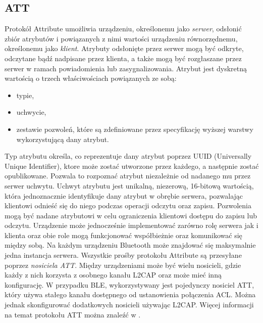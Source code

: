 \subsection{ATT}
Protokół Attribute umożliwia urządzeniu, określonemu jako \textit{serwer}, odsłonić zbiór atrybutów i powiązanych z nimi wartości urządzeniu równorzędnemu, określonemu jako \textit{klient}. Atrybuty odsłonięte przez serwer mogą być odkryte, odczytane bądź nadpisane przez klienta, a także mogą być rozgłaszane przez serwer w ramach powiadomienia lub zasygnalizowania. Atrybut jest dyskretną wartością o trzech właściwościach powiązanych ze sobą:
\begin{itemize}
    \item typie,
    \item uchwycie,
    \item zestawie pozwoleń, które są zdefiniowane przez specyfikację wyższej warstwy wykorzystującą dany atrybut.
\end{itemize}
Typ atrybutu określa, co reprezentuje dany atrybut poprzez UUID (Universally Unique Identifier), ktore może zostać utworzone przez każdego, a następnie zostać opublikowane. Pozwala to rozpoznać atrybut niezależnie od nadanego mu przez serwer uchwytu. Uchwyt atrybutu jest unikalną, niezerową, 16-bitową wartością, która jednoznacznie identyfikuje dany atrybut w obrębie serwera, pozwalając klientowi odnieść się do niego podczas operacji odczytu oraz zapisu. Pozwolenia mogą być nadane atrybutowi w celu ograniczenia klientowi dostępu do zapisu lub odczytu.
\newline\newline
\indent Urządzenie może jednocześnie implementować zarówno rolę serwera jak i klienta oraz obie role mogą funkcjonować współbieżnie oraz komunikować się między sobą. Na każdym urządzeniu Bluetooth może znajdować się maksymalnie jedna instancja serwera.
\newline\newline
\indent Wszystkie prośby protokołu Attribute są przesyłane poprzez \textit{nosiciela ATT}. Między urządzeniami może być wielu nosicieli, gdzie każdy z nich korzysta z osobnego kanału L2CAP oraz może mieć inną konfigurację. W przypadku BLE, wykorzystywany jest pojedynczy nosiciel ATT, który używa stałego kanału dostępnego od ustanowienia połączenia ACL. Można jednak skonfigurować dodatkowych nosicieli używając L2CAP. Więcej informacji na temat protokołu ATT można znaleźć w \cite{BT-Corev5.2}. 


